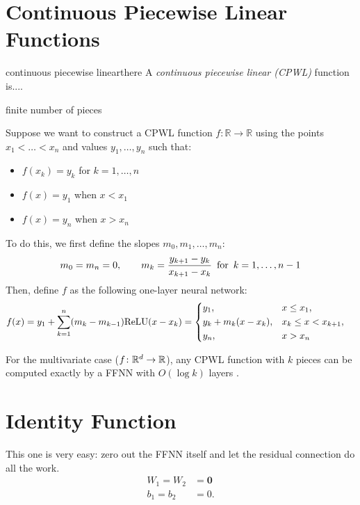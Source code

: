 \section{Continuous Piecewise Linear Functions}

\begin{definition}{continuous piecewise linear}{there}
A \emph{continuous piecewise linear (CPWL)} function is....

finite number of pieces
\end{definition}

Suppose we want to construct a CPWL function \(f \colon \mathbb{R} \to \mathbb{R}\) using the points \(x_1 < \ldots < x_n\) and values \(y_1, \ldots, y_n\) such that:
\begin{itemize}
    \item \(f(x_k) = y_k\) for \(k = 1, \ldots, n\)
    \item \(f(x) = y_1\) when \(x < x_1\)
    \item \(f(x) = y_n\) when \(x > x_n\)
\end{itemize}
To do this, we first define the slopes \(m_0, m_1, \ldots, m_n\):
\begin{align*}
    m_0 = m_{n} = 0,
    \qquad
    m_k = \frac{y_{k+1} - y_{k}}{x_{k+1} - x_{k}}
    \enskip \text{for} \enskip k = 1, \ldots, n-1
\end{align*}
Then, define \(f\) as the following one-layer neural network:
\begin{align*}
    f(x) &= y_1 + \sum_{k = 1}^{n} (m_{k} - m_{k-1}) \mathrm{ReLU}(x - x_k)
    = \begin{dcases}
        y_1, &x \leq x_1, \\
        y_k + m_{k} (x - x_k), & x_k \leq x < x_{k+1}, \\
        y_n, & x > x_n
    \end{dcases}
\end{align*}

For the multivariate case ($f \colon \mathbb{R}^d \to \mathbb{R}$), any CPWL function with $k$ pieces can be computed exactly by a FFNN with $O(\log k)$ layers \citep{arora+:2018}.

\section{Identity Function}

This one is very easy: zero out the FFNN itself and let the residual connection do all the work.
\begin{align*}
W_1 = W_2 &= \mathbf{0} \\ 
b_1 = b_2 &= 0.
\end{align*}

